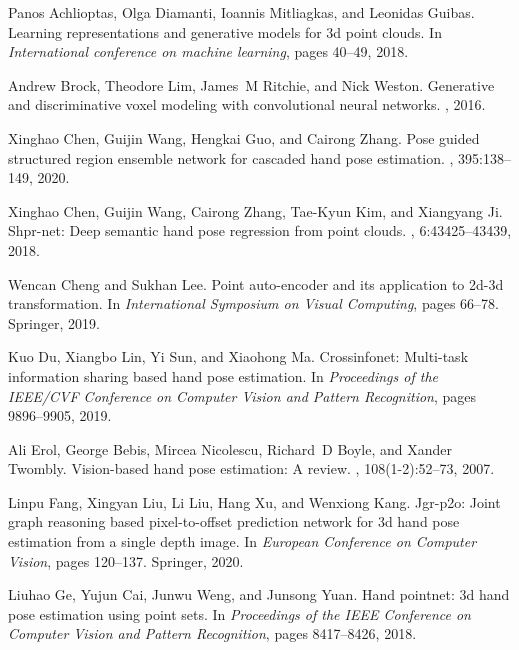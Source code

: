 \documentclass[10pt,twocolumn,letterpaper]{article}
\begin{document}
\begin{thebibliography}{10}\itemsep=-1pt

Panos Achlioptas, Olga Diamanti, Ioannis Mitliagkas, and Leonidas Guibas.
\newblock Learning representations and generative models for 3d point clouds.
\newblock In {\em International conference on machine learning}, pages 40--49,
  2018.

Andrew Brock, Theodore Lim, James~M Ritchie, and Nick Weston.
\newblock Generative and discriminative voxel modeling with convolutional
  neural networks.
, 2016.

Xinghao Chen, Guijin Wang, Hengkai Guo, and Cairong Zhang.
\newblock Pose guided structured region ensemble network for cascaded hand pose
  estimation.
, 395:138--149, 2020.

Xinghao Chen, Guijin Wang, Cairong Zhang, Tae-Kyun Kim, and Xiangyang Ji.
\newblock Shpr-net: Deep semantic hand pose regression from point clouds.
, 6:43425--43439, 2018.

Wencan Cheng and Sukhan Lee.
\newblock Point auto-encoder and its application to 2d-3d transformation.
\newblock In {\em International Symposium on Visual Computing}, pages 66--78.
  Springer, 2019.

Kuo Du, Xiangbo Lin, Yi Sun, and Xiaohong Ma.
\newblock Crossinfonet: Multi-task information sharing based hand pose
  estimation.
\newblock In {\em Proceedings of the IEEE/CVF Conference on Computer Vision and
  Pattern Recognition}, pages 9896--9905, 2019.

Ali Erol, George Bebis, Mircea Nicolescu, Richard~D Boyle, and Xander Twombly.
\newblock Vision-based hand pose estimation: A review.
, 108(1-2):52--73, 2007.

Linpu Fang, Xingyan Liu, Li Liu, Hang Xu, and Wenxiong Kang.
\newblock Jgr-p2o: Joint graph reasoning based pixel-to-offset prediction
  network for 3d hand pose estimation from a single depth image.
\newblock In {\em European Conference on Computer Vision}, pages 120--137.
  Springer, 2020.

Liuhao Ge, Yujun Cai, Junwu Weng, and Junsong Yuan.
\newblock Hand pointnet: 3d hand pose estimation using point sets.
\newblock In {\em Proceedings of the IEEE Conference on Computer Vision and
  Pattern Recognition}, pages 8417--8426, 2018.


\end{thebibliography}
\end{document}
